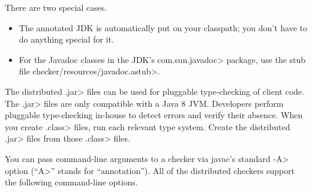 
There are two special cases.
\begin{itemize}
\item
The annotated JDK is automatically put on your
classpath; you don't have to do anything special for it.
\item
For the Javadoc classes in the JDK's \<com.sun.javadoc> package,
use the stub file \<checker/resources/javadoc.astub>.
\end{itemize}



  The distributed
  \<.jar> files can be used for pluggable type-checking of client code.
  The \<.jar> files are only compatible with a Java 8
  JVM.
  Developers perform pluggable type-checking in-house to detect errors and
  verify their absence.
  When you create \<.class> files, run each relevant type system.
  Create the distributed \<.jar> files from those \<.class> files.



You can pass command-line arguments to a checker via javac's standard \<-A>
option (``\<A>'' stands for ``annotation'').  All of the distributed
checkers support the following command-line options.


